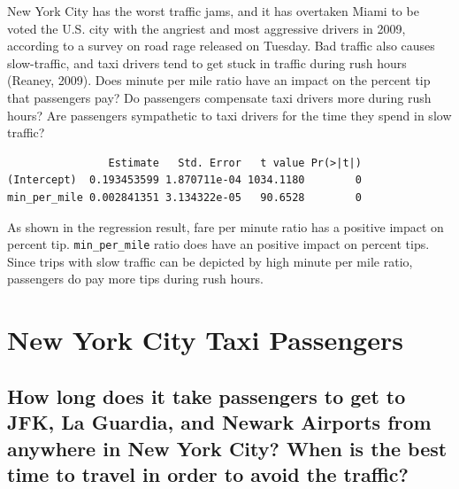 \documentclass[12pt,twoside]{reedthesis}
\theoremstyle{definition}
\theoremstyle{definition}
\theoremstyle{definition}
\theoremstyle{remark}
\begin{document}
New York City has the worst traffic jams, and it has overtaken Miami to
be voted the U.S. city with the angriest and most aggressive drivers in
2009, according to a survey on road rage released on Tuesday. Bad
traffic also causes slow-traffic, and taxi drivers tend to get stuck in
traffic during rush hours (Reaney, 2009). Does minute per mile ratio
have an impact on the percent tip that passengers pay? Do passengers
compensate taxi drivers more during rush hours? Are passengers
sympathetic to taxi drivers for the time they spend in slow traffic?
\begin{verbatim}
                Estimate   Std. Error   t value Pr(>|t|)
(Intercept)  0.193453599 1.870711e-04 1034.1180        0
min_per_mile 0.002841351 3.134322e-05   90.6528        0
\end{verbatim}
As shown in the regression result, fare per minute ratio has a positive
impact on percent tip. \texttt{min\_per\_mile} ratio does have an
positive impact on percent tips. Since trips with slow traffic can be
depicted by high minute per mile ratio, passengers do pay more tips
during rush hours.

\chapter{New York City Taxi Passengers}\label{chapter4}

\section{How long does it take passengers to get to JFK, La Guardia, and
Newark Airports from anywhere in New York City? When is the best time to
travel in order to avoid the
traffic?}\label{how-long-does-it-take-passengers-to-get-to-jfk-la-guardia-and-newark-airports-from-anywhere-in-new-york-city-when-is-the-best-time-to-travel-in-order-to-avoid-the-traffic}
\end{document}
